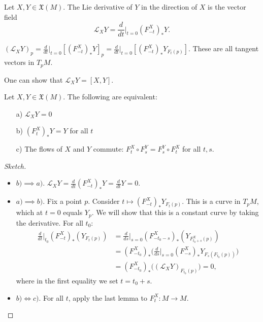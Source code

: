 \begin{definition}
    Let $X, Y \in \mathfrak{X}(M)$.
    The Lie derivative of $Y$ in the direction of $X$ is the vector field
    \[
        \mathcal{L}_{X} Y = \frac{d}{dt}\Big|_{t=0} (F^{X}_{-t})_* Y
    .\] 
\end{definition}
\begin{remark}
    $(\mathcal{L}_{X} Y)_p = \frac{d}{dt}\Big|_{t=0} [(F^{X}_{-t})_* Y]_p = 
    \frac{d}{dt}\Big|_{t=0} [(F^{X}_{-t})_* Y_{F_t(p)}]$.
    These are all tangent vectors in $T_p M$.
\end{remark}
\begin{remark}
    One can show that $\mathcal{L}_{X} Y = [X, Y]$.
\end{remark}
\begin{prop}
    Let $X, Y \in \mathfrak{X}(M)$. The following are equivalent:
    \begin{itemize}
        \item[a)] $\mathcal{L}_{X} Y = 0$ 
        \item[b)] $(F_t^{X})_* Y = Y$  for all $t$
        \item[c)]  The flows of $X$ and $Y$ commute:  $F^{X}_t\circ F^{Y}_s = F^{Y}_s\circ F^{X}_t$ for all $t,s$.
    \end{itemize}
\end{prop}

\begin{proof}[Sketch]
    \begin{itemize}
        \item $b) \implies a)$. $\mathcal{L}_{X} Y = \frac{d}{dt} (F_{-t}^{X})_* Y = \frac{d}{dt}Y = 0$.
        \item $a) \implies b)$. Fix a point $p$. Consider $t \mapsto (F_{-t}^{X})_* Y_{F_t(p)}$. This is a curve in $T_pM$, which
         at $t=0$  equals $Y_p$. We will show that this is a constant curve by taking the derivative.  For all $t_0$:
  \begin{align*}
 \frac{d}{dt}\Big|_{t_0} (F^X_{-t})_* (Y_{F_t(p)}) &= 
            \frac{d}{ds} \Big|_{s=0} (F^X_{-t_0 -s})_* (Y_{F^X_{t_0+s}(p)})\\
          &=  (F^X_{-t_0})_* \Big(\frac{d}{ds}\Big|_{s=0}(F^X_{-s})_* Y_{F_s(F_{t_0}(p))}\Big)\\
  &=   (F^X_{-t_0})_*  \Big((\mathcal{L}_{X} Y)_{  F_{t_0}(p)}\Big)=0,
\end{align*}                
where in the first equality we set $t=t_0+s$.
\item $b) \Leftrightarrow c)$. For all $t$, apply the last lemma to $F_t^X:M\to M$.
             \end{itemize}
\end{proof}

